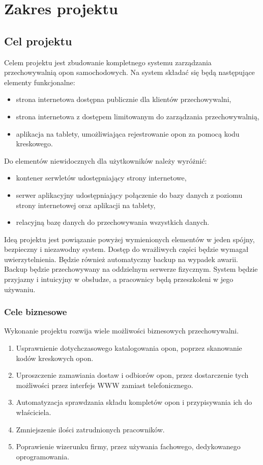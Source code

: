 \section{Zakres projektu}
  \subsection{Cel projektu}
    Celem projektu jest zbudowanie kompletnego systemu zarządzania przechowywalnią opon samochodowych.
    Na system składać się będą następujące elementy funkcjonalne:
    \begin{itemize}
      \item strona internetowa dostępna publicznie dla klientów przechowywalni,
      \item strona internetowa z dostępem limitowanym do zarządzania przechowywalnią,
      \item aplikacja na tablety, umożliwiająca rejestrowanie opon za pomocą kodu kreskowego.
    \end{itemize}
    Do elementów niewidocznych dla użytkowników należy wyróżnić:
    \begin{itemize}
      \item kontener serwletów udostępniający strony internetowe,
      \item serwer aplikacyjny udostępniający połączenie do bazy danych z poziomu strony internetowej oraz aplikacji na tablety,
      \item relacyjną bazę danych do przechowywania wszystkich danych.
    \end{itemize}
    Ideą projektu jest powiązanie powyżej wymienionych elementów w jeden spójny, bezpieczny i niezawodny system.
    Dostęp do wrażliwych części będzie wymagał uwierzytelnienia.
    Będzie również automatyczny backup na wypadek awarii.
    Backup będzie przechowywany na oddzielnym serwerze fizycznym.
    System będzie przyjazny i intuicyjny w obsłudze, a pracownicy będą przeszkoleni w jego używaniu.
    \subsubsection{Cele biznesowe}
      Wykonanie projektu rozwija wiele możliwości biznesowych przechowywalni.
      \begin{enumerate}
        \item Usprawnienie dotychczasowego katalogowania opon, poprzez skanowanie kodów kreskowych opon.
        \item Uproszczenie zamawiania dostaw i odbiorów opon, przez dostarczenie tych możliwości przez interfejs WWW zamiast telefonicznego.
        \item Automatyzacja sprawdzania składu kompletów opon i przypisywania ich do właściciela.
        \item Zmniejszenie ilości zatrudnionych pracowników.
        \item Poprawienie wizerunku firmy, przez używania fachowego, dedykowanego oprogramowania.
      \end{enumerate}
